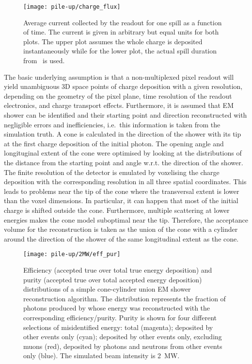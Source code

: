 \begin{figure}[htb]
	\centering
	\texttt{[image: pile-up/charge\_flux]}
	\caption{Average current collected by the readout for one spill as a function of time.
	The current is given in arbitrary but equal units for both plots.
	The upper plot assumes the whole charge is deposited instantaneously while for the lower plot, the actual spill duration from~\cite{dune2} is used.}
	\label{fig:dune-nd_charge-flux}
\end{figure}

The basic underlying assumption is that a non-multiplexed pixel readout will yield unambiguous 3D space points of charge deposition with a given resolution, depending on the geometry of the pixel plane, time resolution of the readout electronics, and charge transport effects.
Furthermore, it is assumed that EM shower can be identified and their starting point and direction reconstructed with negligible errors and inefficiencies, i.e.\ this information is taken from the simulation truth.
A cone is calculated in the direction of the shower with its tip at the first charge deposition of the initial photon.
The opening angle and longituginal extent of the cone were optimised by looking at the distributions of the distance from the starting point and angle w.r.t. the direction of the shower.
The finite resolution of the detector is emulated by voxelising the charge deposition with the corresponding resolution in all three spatial coordinates.
This leads to problems near the tip of the cone where the transversal extent is lower than the voxel dimensions.
In particular, it can happen that most of the initial charge is shifted outside the cone.
Furthermore, multiple scattering at lower energies makes the cone model suboptimal near the tip.
Therefore, the acceptance volume for the reconstruction is taken as the union of the cone with a cylinder around the direction of the shower of the same longitudinal extent as the cone.

\begin{figure}[htb]
	\centering
	\texttt{[image: pile-up/2MW/eff\_pur]}
	\caption{Efficiency (accepted true over total true energy deposition) and purity (accepted true over total accepted energy deposition) distributions of a simple cone-cylinder union EM shower reconstruction algorithm.
	The distribution represents the fraction of photons produced by \Pgpz whose energy was reconstructed with the corresponding efficiency/purity.
	Purity is shown for four different selections of misidentified energy: total (magenta); deposited by other events only (cyan); deposited by other events only, excluding muons (red), deposited by photons and neutrons from other events only (blue).
	The simulated beam intensity is \SI{2}{\mega\watt}.}
	\label{fig:dune-nd_2MW-eff-pur}
\end{figure}

